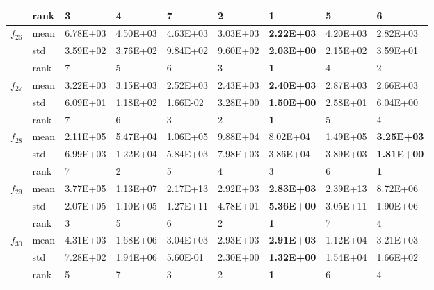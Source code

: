 \documentclass[a4paper,13pt,2p]{report}
\begin{document}
\begin{table}[!t]
\begin{tabular}{|l|l|l|l|l|l|l|l|l|}
                     & rank & 3        & 4        & 7        & 2                 & \textbf{1}         & 5        & 6                 \\ \hline
\multirow{3}{*}{$f_{26}$} & mean & 6.78E+03 & 4.50E+03 & 4.63E+03 & 3.03E+03          & \textbf{2.22E+03}  & 4.20E+03 & 2.82E+03          \\ \cline{2-9} 
                     & std  & 3.59E+02 & 3.76E+02 & 9.84E+02 & 9.60E+02          & \textbf{2.03E+00}  & 2.15E+02 & 3.59E+01          \\ \cline{2-9} 
                     & rank & 7        & 5        & 6        & 3                 & \textbf{1}         & 4        & 2                 \\ \hline
\multirow{3}{*}{$f_{27}$} & mean & 3.22E+03 & 3.15E+03 & 2.52E+03 & 2.43E+03          & \textbf{2.40E+03}  & 2.87E+03 & 2.66E+03          \\ \cline{2-9} 
                     & std  & 6.09E+01 & 1.18E+02 & 1.66E-02 & 3.28E+00          & \textbf{1.50E+00}  & 2.58E+01 & 6.04E+00          \\ \cline{2-9} 
                     & rank & 7        & 6        & 3        & 2                 & \textbf{1}         & 5        & 4                 \\ \hline
\multirow{3}{*}{$f_{28}$} & mean & 2.11E+05 & 5.47E+04 & 1.06E+05 & 9.88E+04          & 8.02E+04           & 1.49E+05 & \textbf{3.25E+03} \\ \cline{2-9} 
                     & std  & 6.99E+03 & 1.22E+04 & 5.84E+03 & 7.98E+03          & 3.86E+04           & 3.89E+03 & \textbf{1.81E+00} \\ \cline{2-9} 
                     & rank & 7        & 2        & 5        & 4                 & 3                  & 6        & \textbf{1}        \\ \hline
\multirow{3}{*}{$f_{29}$} & mean & 3.77E+05 & 1.13E+07 & 2.17E+13 & 2.92E+03          & \textbf{2.83E+03}  & 2.39E+13 & 8.72E+06          \\ \cline{2-9} 
                     & std  & 2.07E+05 & 1.10E+05 & 1.27E+11 & 4.78E+01          & \textbf{5.36E+00}  & 3.05E+11 & 1.90E+06          \\ \cline{2-9} 
                     & rank & 3        & 5        & 6        & 2                 & \textbf{1}         & 7        & 4                 \\ \hline
\multirow{3}{*}{$f_{30}$} & mean & 4.31E+03 & 1.68E+06 & 3.04E+03 & 2.93E+03          & \textbf{2.91E+03}  & 1.12E+04 & 3.21E+03          \\ \cline{2-9} 
                     & std  & 7.28E+02 & 1.94E+06 & 5.60E-01 & 2.30E+00          & \textbf{1.32E+00}  & 1.54E+04 & 1.66E+02          \\ \cline{2-9} 
                     & rank & 5        & 7        & 3        & 2                 & \textbf{1}         & 6        & 4                 \\ \hline
\end{tabular}
\end{table}
\end{document}
